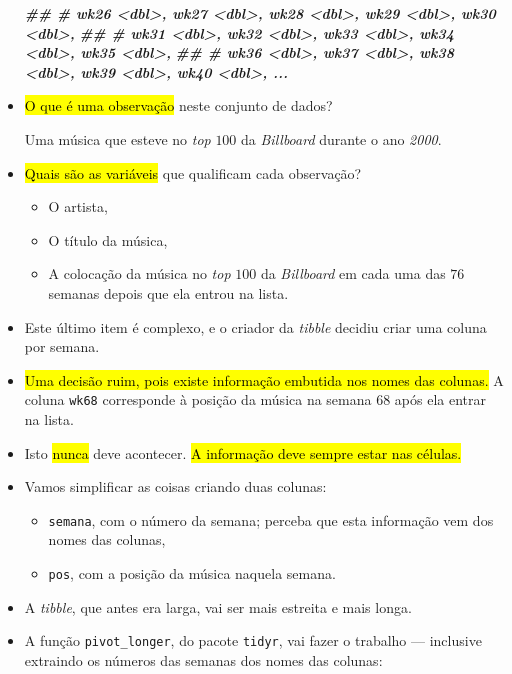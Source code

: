 \documentclass[
  11pt]{report}
\newenvironment{Shaded}{\begin{snugshade}}{\end{snugshade}}
\newcommand{\DocumentationTok}[1]{\textcolor[rgb]{0.56,0.35,0.01}{\textbf{\textit{#1}}}}
\renewenvironment{Shaded}{
    \begin{mdframed}[%
      roundcorner=2pt,%
      innerleftmargin=5pt,%
      innerrightmargin=5pt,%
      topline=true,%
      leftline=true,%
      rightline=true,%
      bottomline=true,%
      linewidth=0.5pt,%
      linecolor=black!20,%
      backgroundcolor=black!2,%
      skipabove=2ex,%
      skipbelow=2.5ex%
    ]%
  }
  {
    \end{mdframed}
  }
\begin{document}
\begin{itemize}
\begin{Shaded}
\begin{Highlighting}[]
\DocumentationTok{\#\# \#   wk26 \textless{}dbl\textgreater{}, wk27 \textless{}dbl\textgreater{}, wk28 \textless{}dbl\textgreater{}, wk29 \textless{}dbl\textgreater{}, wk30 \textless{}dbl\textgreater{},}
\DocumentationTok{\#\# \#   wk31 \textless{}dbl\textgreater{}, wk32 \textless{}dbl\textgreater{}, wk33 \textless{}dbl\textgreater{}, wk34 \textless{}dbl\textgreater{}, wk35 \textless{}dbl\textgreater{},}
\DocumentationTok{\#\# \#   wk36 \textless{}dbl\textgreater{}, wk37 \textless{}dbl\textgreater{}, wk38 \textless{}dbl\textgreater{}, wk39 \textless{}dbl\textgreater{}, wk40 \textless{}dbl\textgreater{}, ...}
\end{Highlighting}
\end{Shaded}
\item
  {\hl{O que é uma observação}} neste conjunto de dados?

  Uma música que esteve no \emph{top} $100$ da \emph{Billboard} durante o ano \emph{2000}.
\item
  {\hl{Quais são as variáveis}} que qualificam cada observação?

  \begin{itemize}
  \item
    O artista,
  \item
    O título da música,
  \item
    A colocação da música no \emph{top} $100$ da \emph{Billboard} em cada uma das $76$ semanas depois que ela entrou na lista.
  \end{itemize}
\item
  Este último item é complexo, e o criador da \emph{tibble} decidiu criar uma coluna por semana.
\item
  {\hl{Uma decisão ruim, pois existe informação embutida nos nomes das colunas.}} A coluna \texttt{wk68} corresponde à posição da música na semana $68$ após ela entrar na lista.
\item
  Isto {\hl{nunca}} deve acontecer. {\hl{A informação deve sempre estar nas células.}}
\item
  Vamos simplificar as coisas criando duas colunas:

  \begin{itemize}
  \item
    \texttt{semana}, com o número da semana; perceba que esta informação vem dos nomes das colunas,
  \item
    \texttt{pos}, com a posição da música naquela semana.
  \end{itemize}
\item
  A \emph{tibble}, que antes era larga, vai ser mais estreita e mais longa.
\item
  A função \texttt{pivot\_longer}, do pacote \texttt{tidyr}, vai fazer o trabalho --- inclusive extraindo os números das semanas dos nomes das colunas:


\end{itemize}
\end{document}
